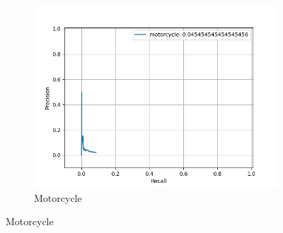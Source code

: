 \begin{figure}
\begin{subfigure}[t]{0.325\textwidth}
    		\includegraphics[width=\textwidth]{images/basic_pr/class_motorcycle_pr.jpg}
    		\caption{Motorcycle}
    	\end{subfigure}
    	

\end{figure}
